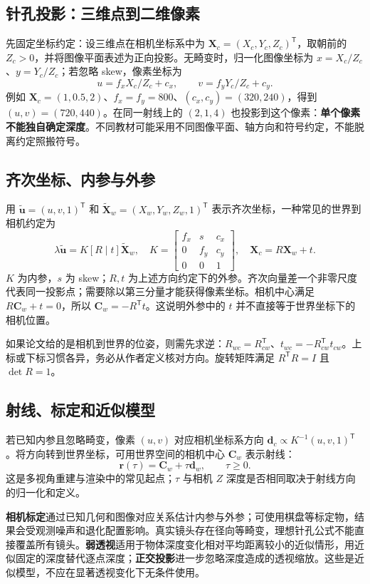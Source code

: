 \documentclass[11pt,a4paper,fontset=none]{ctexart}
\begin{document}
\subsection{针孔投影：三维点到二维像素}
先固定坐标约定：设三维点在相机坐标系中为 $\mathbf X_c=(X_c,Y_c,Z_c)^{\mathsf T}$，取朝前的 $Z_c>0$，并将图像平面表述为正向投影。无畸变时，归一化图像坐标为 $x=X_c/Z_c$、$y=Y_c/Z_c$；若忽略 skew，像素坐标为
\[
u=f_x X_c/Z_c+c_x,\qquad v=f_y Y_c/Z_c+c_y.
\]
例如 $\mathbf X_c=(1,0.5,2)$、$f_x=f_y=800$、$(c_x,c_y)=(320,240)$，得到 $(u,v)=(720,440)$。在同一射线上的 $(2,1,4)$ 也投影到这个像素：\textbf{单个像素不能独自确定深度}。不同教材可能采用不同图像平面、轴方向和符号约定，不能脱离约定照搬符号。
\subsection{齐次坐标、内参与外参}
用 $\tilde{\mathbf u}=(u,v,1)^{\mathsf T}$ 和 $\tilde{\mathbf X}_w=(X_w,Y_w,Z_w,1)^{\mathsf T}$ 表示齐次坐标，一种常见的世界到相机约定为
\[
\lambda\tilde{\mathbf u}=K[R\mid t]\tilde{\mathbf X}_w,
\quad K=\begin{bmatrix}f_x&s&c_x\\0&f_y&c_y\\0&0&1\end{bmatrix},\quad
\mathbf X_c=R\mathbf X_w+t.
\]
$K$ 为内参，$s$ 为 skew；$R,t$ 为上述方向约定下的外参。齐次向量差一个非零尺度代表同一投影点；需要除以第三分量才能获得像素坐标。相机中心满足 $R\mathbf C_w+t=0$，所以 $\mathbf C_w=-R^{\mathsf T}t$。这说明外参中的 $t$ 并不直接等于世界坐标下的相机位置。

如果论文给的是相机到世界的位姿，则需先求逆：$R_{wc}=R_{cw}^{\mathsf T}$、$t_{wc}=-R_{cw}^{\mathsf T}t_{cw}$。上标或下标习惯各异，务必从作者定义核对方向。旋转矩阵满足 $R^{\mathsf T}R=I$ 且 $\det R=1$。
\subsection{射线、标定和近似模型}
若已知内参且忽略畸变，像素 $(u,v)$ 对应相机坐标系方向 $\mathbf d_c\propto K^{-1}(u,v,1)^{\mathsf T}$。将方向转到世界坐标，可用世界空间的相机中心 $\mathbf C_w$ 表示射线：
\[
\mathbf r(\tau)=\mathbf C_w+\tau\mathbf d_w,\qquad \tau\geq0.
\]
这是多视角重建与渲染中的常见起点；$\tau$ 与相机 $Z$ 深度是否相同取决于射线方向的归一化和定义。

\textbf{相机标定}通过已知几何和图像对应关系估计内参与外参；可使用棋盘等标定物，结果会受观测噪声和退化配置影响。真实镜头存在径向等畸变，理想针孔公式不能直接覆盖所有镜头。\textbf{弱透视}适用于物体深度变化相对平均距离较小的近似情形，用近似固定的深度替代逐点深度；\textbf{正交投影}进一步忽略深度造成的透视缩放。这些是近似模型，不应在显著透视变化下无条件使用。
\end{document}
